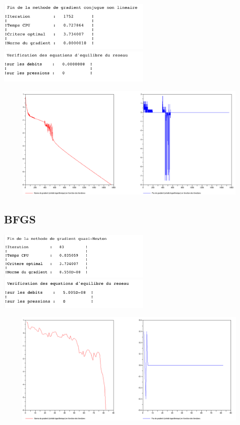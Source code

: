 \begin{center}
  \includegraphics[width=20em,valign=t]{d_conj.png}
  \includegraphics[width=20em,valign=t]{d_conj_v.png}

  \includegraphics[width=40em,height=15em]{d_conj_f.png}
\end{center}

\subsection{BFGS}

\begin{center}
  \includegraphics[width=20em,valign=t]{d_quasi.png}
  \includegraphics[width=20em,valign=t]{d_quasi_v.png}

  \includegraphics[width=40em,height=15em]{d_quasi_f.png}
\end{center}


